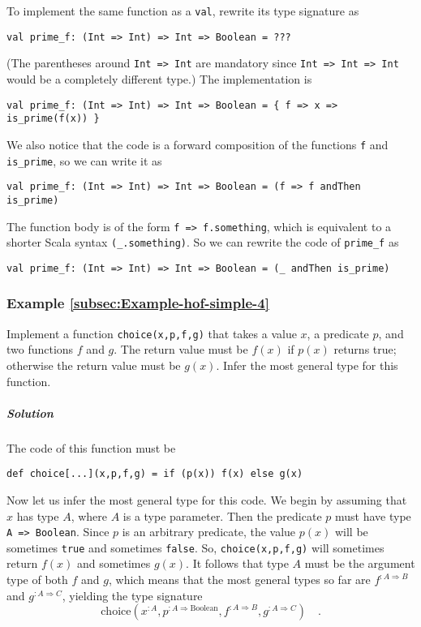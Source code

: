 To implement the same function as a \lstinline!val!, rewrite its
type signature as
\begin{lstlisting}
val prime_f: (Int => Int) => Int => Boolean = ???
\end{lstlisting}
(The parentheses around \lstinline!Int => Int! are mandatory since
\lstinline!Int => Int => Int! would be a completely different type.)
The implementation is
\begin{lstlisting}
val prime_f: (Int => Int) => Int => Boolean = { f => x => is_prime(f(x)) }
\end{lstlisting}
We also notice that the code is a forward composition of the functions
\lstinline!f! and \lstinline!is_prime!, so we can write it as
\begin{lstlisting}
val prime_f: (Int => Int) => Int => Boolean = (f => f andThen is_prime)
\end{lstlisting}
The function body is of the form \lstinline!f => f.something!, which
is equivalent to a shorter Scala syntax \lstinline!(_.something)!.
So we can rewrite the code of \lstinline!prime_f! as
\begin{lstlisting}
val prime_f: (Int => Int) => Int => Boolean = (_ andThen is_prime)
\end{lstlisting}


\subsubsection{Example \label{subsec:Example-hof-simple-4}\ref{subsec:Example-hof-simple-4}}

Implement a function \lstinline!choice(x,p,f,g)! that takes a value
$x$, a predicate $p$, and two functions $f$ and $g$. The return
value must be $f(x)$ if $p(x)$ returns true; otherwise the return
value must be $g(x)$. Infer the most general type for this function.

\subparagraph{Solution}

The code of this function must be
\begin{lstlisting}
def choice[...](x,p,f,g) = if (p(x)) f(x) else g(x)
\end{lstlisting}
Now let us infer the most general type for this code. We begin by
assuming that $x$ has type $A$, where $A$ is a type parameter.
Then the predicate $p$ must have type \lstinline!A => Boolean!.
Since $p$ is an arbitrary predicate, the value $p(x)$ will be sometimes
\lstinline!true! and sometimes \lstinline!false!. So, \lstinline!choice(x,p,f,g)!
will sometimes return $f(x)$ and sometimes $g(x)$. It follows that
type $A$ must be the argument type of both $f$ and $g$, which means
that the most general types so far are $f^{:A\Rightarrow B}$ and
$g^{:A\Rightarrow C}$, yielding the type signature
\[
\text{choice}(x^{:A},p^{:A\Rightarrow\text{Boolean}},f^{:A\Rightarrow B},g^{:A\Rightarrow C})\quad.
\]

